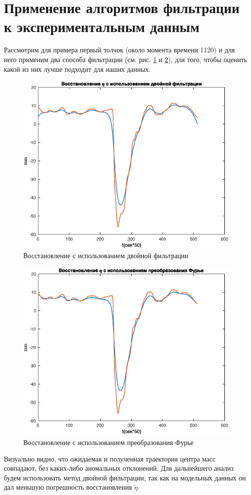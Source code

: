\documentclass[a4paper,12pt, openany]{book}
\theoremstyle{plain} %
\theoremstyle{definition} %
\theoremstyle{remark} %
\numberwithin{equation}{chapter}
\begin{document}
{\section{Применение алгоритмов фильтрации к экспериментальным данным}
Рассмотрим для примера первый толчок (около момента времени 1120) и для него применим два способа
фильтрации (см. рис. \ref{restore_double_real} и \ref{restore_fur_real}), для того, 
чтобы оценить какой из них лучше подходит для наших данных.

\begin{figure}[h!]
    \centering
    \includegraphics[width=0.65\linewidth]{restore_eta_double_real.eps}
    \caption{Восстановление с использованием двойной фильтрации}
    \label{restore_double_real}
\end{figure}

\begin{figure}[h!]
    \centering
    \includegraphics[width=0.65\linewidth]{restore_eta_fur_real.eps}
    \caption{Восстановление с использованием преобразования Фурье}
    \label{restore_fur_real}
\end{figure}

Визуально видно, что ожидаемая и полученная траектория центра масс совпадают,
без каких-либо аномальных отклонений. Для дальнейшего анализ будем использовать метод двойной фильтрации, 
так как на модельных данных он дал меньшую погрешность восстановления $\tilde{\eta}$.

}
\end{document}
